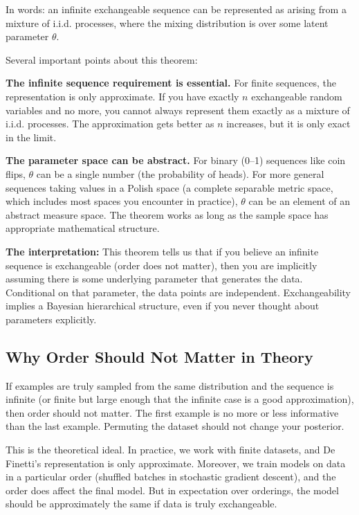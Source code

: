 In words: an infinite exchangeable sequence can be represented as arising from a mixture of i.i.d. processes, where the mixing distribution is over some latent parameter $\theta$.

Several important points about this theorem:

\textbf{The infinite sequence requirement is essential.} For finite sequences, the representation is only approximate. If you have exactly $n$ exchangeable random variables and no more, you cannot always represent them exactly as a mixture of i.i.d. processes. The approximation gets better as $n$ increases, but it is only exact in the limit.

\textbf{The parameter space can be abstract.} For binary (0--1) sequences like coin flips, $\theta$ can be a single number (the probability of heads). For more general sequences taking values in a Polish space (a complete separable metric space, which includes most spaces you encounter in practice), $\theta$ can be an element of an abstract measure space. The theorem works as long as the sample space has appropriate mathematical structure.

\textbf{The interpretation:} This theorem tells us that if you believe an infinite sequence is exchangeable (order does not matter), then you are implicitly assuming there is some underlying parameter that generates the data. Conditional on that parameter, the data points are independent. Exchangeability implies a Bayesian hierarchical structure, even if you never thought about parameters explicitly.

\subsection{Why Order Should Not Matter in Theory}

If examples are truly sampled from the same distribution and the sequence is infinite (or finite but large enough that the infinite case is a good approximation), then order should not matter. The first example is no more or less informative than the last example. Permuting the dataset should not change your posterior.

This is the theoretical ideal. In practice, we work with finite datasets, and De Finetti's representation is only approximate. Moreover, we train models on data in a particular order (shuffled batches in stochastic gradient descent), and the order does affect the final model. But in expectation over orderings, the model should be approximately the same if data is truly exchangeable.

